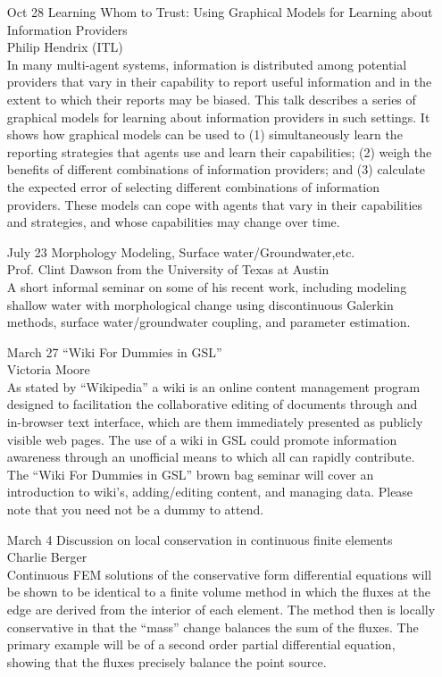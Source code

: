 \documentclass[12]{article}
\begin{document}
\begin{enumerate}

\item[Oct 28] Learning Whom to Trust: Using Graphical Models for
  Learning about
  Information Providers\\Philip Hendrix (ITL)\\
  In many multi-agent systems, information is distributed among
  potential providers that vary in their capability to report useful
  information and in the extent to which their reports may be biased.
  This talk describes a series of graphical models for learning about
  information providers in such settings. It shows how graphical
  models can be used to (1) simultaneously learn the reporting
  strategies that agents use and learn their capabilities; (2) weigh
  the benefits of different combinations of information providers; and
  (3) calculate the expected error of selecting different combinations
  of information providers. These models can cope with agents that
  vary in their capabilities and strategies, and whose capabilities
  may change over time.


\item[July 23] Morphology Modeling, Surface water/Groundwater,etc.\\Prof. Clint Dawson from the University of Texas at Austin\\
  A short informal seminar on some of his recent work, including modeling shallow water with morphological change using discontinuous Galerkin methods, surface water/groundwater coupling, and parameter estimation.

\item[March 27] ``Wiki For Dummies in GSL''\\ Victoria Moore\\
  As stated by ``Wikipedia'' a wiki is an online content management program designed to facilitation the collaborative editing of documents through and in-browser text interface, which are them immediately presented as publicly visible web pages.  The use of a wiki in GSL could promote information awareness through an unofficial means to which all can rapidly contribute.  The ``Wiki For Dummies in GSL'' brown bag seminar will cover an introduction to wiki's, adding/editing content, and managing data.  Please note that you need not be a dummy to attend.

\item[March 4] Discussion on local conservation in continuous finite elements\\ Charlie Berger\\
  Continuous FEM solutions of the conservative form differential equations will be shown to be identical to a finite volume method in which the fluxes at the edge are derived from the interior of each element.  The method then is locally conservative in that the ``mass'' change balances the sum of the fluxes.  The primary example will be of a second order partial differential equation, showing that the fluxes precisely balance the point source.


\end{enumerate}
\end{document}
